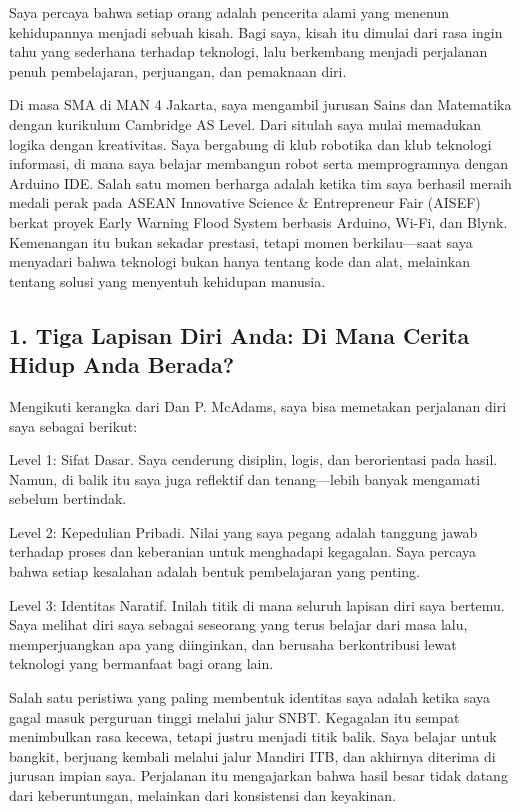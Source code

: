 \documentclass[
  letterpaper,
  DIV=11,
  numbers=noendperiod]{scrreprt}
\begin{document}
Saya percaya bahwa setiap orang adalah pencerita alami yang menenun
kehidupannya menjadi sebuah kisah. Bagi saya, kisah itu dimulai dari
rasa ingin tahu yang sederhana terhadap teknologi, lalu berkembang
menjadi perjalanan penuh pembelajaran, perjuangan, dan pemaknaan diri.

Di masa SMA di MAN 4 Jakarta, saya mengambil jurusan Sains dan
Matematika dengan kurikulum Cambridge AS Level. Dari situlah saya mulai
memadukan logika dengan kreativitas. Saya bergabung di klub robotika dan
klub teknologi informasi, di mana saya belajar membangun robot serta
memprogramnya dengan Arduino IDE. Salah satu momen berharga adalah
ketika tim saya berhasil meraih medali perak pada ASEAN Innovative
Science \& Entrepreneur Fair (AISEF) berkat proyek Early Warning Flood
System berbasis Arduino, Wi-Fi, dan Blynk. Kemenangan itu bukan sekadar
prestasi, tetapi momen berkilau---saat saya menyadari bahwa teknologi
bukan hanya tentang kode dan alat, melainkan tentang solusi yang
menyentuh kehidupan manusia.

\subsection{\texorpdfstring{\textbf{1. Tiga Lapisan Diri Anda: Di Mana
Cerita Hidup Anda
Berada?}}{1. Tiga Lapisan Diri Anda: Di Mana Cerita Hidup Anda Berada?}}\label{tiga-lapisan-diri-anda-di-mana-cerita-hidup-anda-berada}

Mengikuti kerangka dari Dan P. McAdams, saya bisa memetakan perjalanan
diri saya sebagai berikut:

Level 1: Sifat Dasar. Saya cenderung disiplin, logis, dan berorientasi
pada hasil. Namun, di balik itu saya juga reflektif dan tenang---lebih
banyak mengamati sebelum bertindak.

Level 2: Kepedulian Pribadi. Nilai yang saya pegang adalah tanggung
jawab terhadap proses dan keberanian untuk menghadapi kegagalan. Saya
percaya bahwa setiap kesalahan adalah bentuk pembelajaran yang penting.

Level 3: Identitas Naratif. Inilah titik di mana seluruh lapisan diri
saya bertemu. Saya melihat diri saya sebagai seseorang yang terus
belajar dari masa lalu, memperjuangkan apa yang diinginkan, dan berusaha
berkontribusi lewat teknologi yang bermanfaat bagi orang lain.

Salah satu peristiwa yang paling membentuk identitas saya adalah ketika
saya gagal masuk perguruan tinggi melalui jalur SNBT. Kegagalan itu
sempat menimbulkan rasa kecewa, tetapi justru menjadi titik balik. Saya
belajar untuk bangkit, berjuang kembali melalui jalur Mandiri ITB, dan
akhirnya diterima di jurusan impian saya. Perjalanan itu mengajarkan
bahwa hasil besar tidak datang dari keberuntungan, melainkan dari
konsistensi dan keyakinan.
\end{document}
